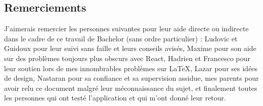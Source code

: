 \subsection{Remerciements}

J'aimerais remercier les personnes suivantes pour leur aide directe ou indirecte dans le cadre de ce travail de Bachelor (sans ordre particulier) : Ludovic et Guidoux pour leur suivi sans faille et leurs conseils avisés, Maxime pour son aide sur des problèmes toujours plus obscurs avec React, Hadrien et Francesco pour leur soutien lors de mes innombrables problèmes sur LaTeX, Lazar pour ses idées de design, Nastaran pour sa confiance et sa supervision assidue, mes parents pour avoir relu ce document malgré leur méconnaissance du sujet, et finalement toutes les personnes qui ont testé l'application et qui m'ont donné leur retour.

\vfil
\hspace{8cm}\makeatletter\@author\makeatother\par
\hspace{8cm}\begin{minipage}{5cm}
  \printsignature
\end{minipage}

